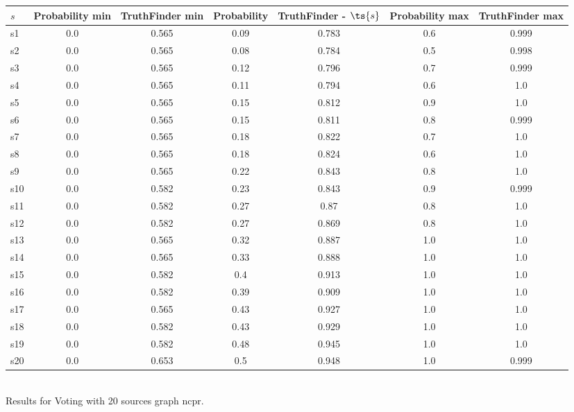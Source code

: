 \documentclass{article}
\begin{document}
\noindent\begin{tabular}{|l|c|c|c|c|c|c|}
\hline
$s$& Probability min & TruthFinder min & Probability & TruthFinder - $\ts{s}$ & Probability max & TruthFinder max\\
\hline
s1 &0.0 & 0.565 & 0.09 & 0.783 & 0.6 & 0.999\\
\hline
s2 &0.0 & 0.565 & 0.08 & 0.784 & 0.5 & 0.998\\
\hline
s3 &0.0 & 0.565 & 0.12 & 0.796 & 0.7 & 0.999\\
\hline
s4 &0.0 & 0.565 & 0.11 & 0.794 & 0.6 & 1.0\\
\hline
s5 &0.0 & 0.565 & 0.15 & 0.812 & 0.9 & 1.0\\
\hline
s6 &0.0 & 0.565 & 0.15 & 0.811 & 0.8 & 0.999\\
\hline
s7 &0.0 & 0.565 & 0.18 & 0.822 & 0.7 & 1.0\\
\hline
s8 &0.0 & 0.565 & 0.18 & 0.824 & 0.6 & 1.0\\
\hline
s9 &0.0 & 0.565 & 0.22 & 0.843 & 0.8 & 1.0\\
\hline
s10 &0.0 & 0.582 & 0.23 & 0.843 & 0.9 & 0.999\\
\hline
s11 &0.0 & 0.582 & 0.27 & 0.87 & 0.8 & 1.0\\
\hline
s12 &0.0 & 0.582 & 0.27 & 0.869 & 0.8 & 1.0\\
\hline
s13 &0.0 & 0.565 & 0.32 & 0.887 & 1.0 & 1.0\\
\hline
s14 &0.0 & 0.565 & 0.33 & 0.888 & 1.0 & 1.0\\
\hline
s15 &0.0 & 0.582 & 0.4 & 0.913 & 1.0 & 1.0\\
\hline
s16 &0.0 & 0.582 & 0.39 & 0.909 & 1.0 & 1.0\\
\hline
s17 &0.0 & 0.565 & 0.43 & 0.927 & 1.0 & 1.0\\
\hline
s18 &0.0 & 0.582 & 0.43 & 0.929 & 1.0 & 1.0\\
\hline
s19 &0.0 & 0.582 & 0.48 & 0.945 & 1.0 & 1.0\\
\hline
s20 &0.0 & 0.653 & 0.5 & 0.948 & 1.0 & 0.999\\
\hline
\end{tabular}\\

\noindent Results for Voting with 20 sources graph ncpr.
\end{document}
